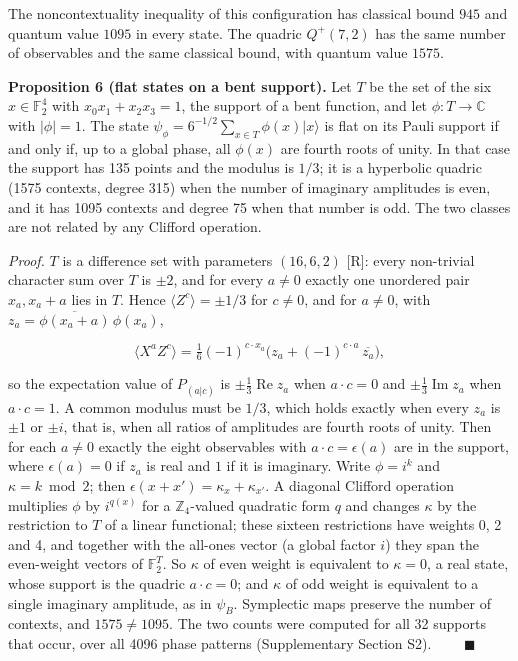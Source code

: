 \documentclass[11pt,a4paper]{article}
\begin{document}
The noncontextuality inequality of this configuration has classical bound \(945\) and quantum value
\(1095\) in every state. The quadric \(Q^+(7,2)\) has the same number of observables and the same classical
bound, with quantum value \(1575\).

\textbf{Proposition 6 (flat states on a bent support).} Let \(T\) be the set of the six \(x \in \mathbb{F}_2^4\) with
\(x_0x_1 + x_2x_3 = 1\), the support of a bent function, and let \(\phi : T \to \mathbb{C}\) with \(|\phi| = 1\).
The state \(\psi_\phi = 6^{-1/2}\sum_{x \in T}\phi(x)|x\rangle\) is flat on its Pauli support if and only if, up
to a global phase, all \(\phi(x)\) are fourth roots of unity. In that case the support has 135 points and the
modulus is \(1/3\); it is a hyperbolic quadric (1575 contexts, degree 315) when the number of imaginary
amplitudes is even, and it has 1095 contexts and degree 75 when that number is odd. The two classes are
not related by any Clifford operation.

\emph{Proof.} \(T\) is a difference set with parameters \((16,6,2)\) {[}R{]}: every non-trivial character sum over \(T\)
is \(\pm 2\), and for every \(a \ne 0\) exactly one unordered pair \(x_a, x_a + a\) lies in \(T\). Hence
\(\langle Z^c\rangle = \pm 1/3\) for \(c \ne 0\), and for \(a \ne 0\), with \(z_a = \overline{\phi(x_a + a)}\,\phi(x_a)\),

\[\langle X^a Z^c \rangle = \tfrac16 (-1)^{c \cdot x_a}\big( z_a + (-1)^{c \cdot a}\, \overline{z_a} \big),\]

so the expectation value of \(P_{(a|c)}\) is \(\pm\tfrac13 \operatorname{Re} z_a\) when \(a \cdot c = 0\) and
\(\pm\tfrac13 \operatorname{Im} z_a\) when \(a \cdot c = 1\). A common modulus must be \(1/3\), which holds exactly
when every \(z_a\) is \(\pm 1\) or \(\pm i\), that is, when all ratios of amplitudes are fourth roots of unity.
Then for each \(a \ne 0\) exactly the eight observables with \(a \cdot c = \epsilon(a)\) are in the support,
where \(\epsilon(a) = 0\) if \(z_a\) is real and \(1\) if it is imaginary. Write \(\phi = i^{k}\) and
\(\kappa = k \bmod 2\); then \(\epsilon(x + x') = \kappa_x + \kappa_{x'}\). A diagonal Clifford operation
multiplies \(\phi\) by \(i^{q(x)}\) for a \(\mathbb{Z}_4\)-valued quadratic form \(q\) and changes \(\kappa\) by the
restriction to \(T\) of a linear functional; these sixteen restrictions have weights 0, 2 and 4, and
together with the all-ones vector (a global factor \(i\)) they span the even-weight vectors of
\(\mathbb{F}_2^{T}\). So \(\kappa\) of even weight is equivalent to \(\kappa = 0\), a real state, whose support is
the quadric \(a \cdot c = 0\); and \(\kappa\) of odd weight is equivalent to a single imaginary amplitude, as
in \(\psi_B\). Symplectic maps preserve the number of contexts, and \(1575 \ne 1095\). The two counts were
computed for all 32 supports that occur, over all 4096 phase patterns (Supplementary Section S2). \(\qquad\blacksquare\)
\end{document}
